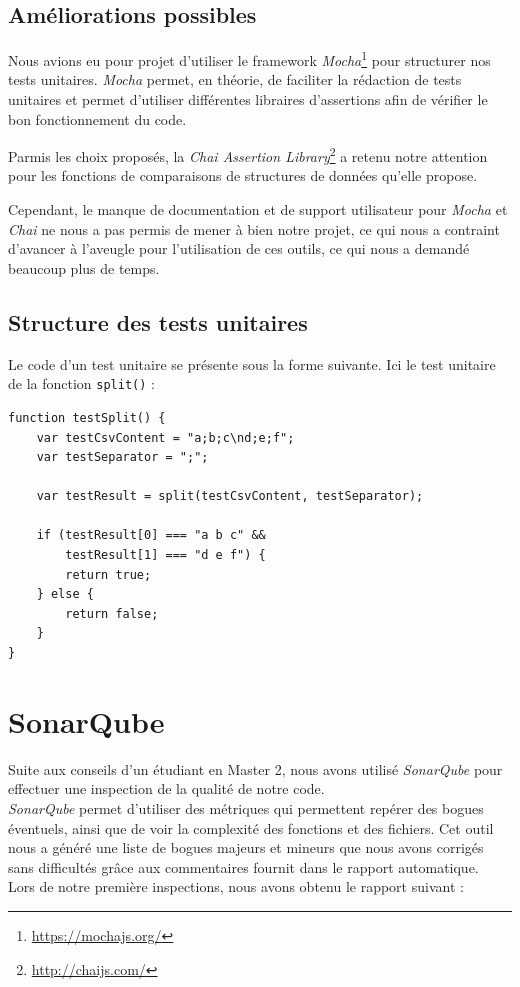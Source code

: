 \subsection{Améliorations possibles}

Nous avions eu pour projet d'utiliser le framework {\it Mocha}\footnote{\url{https://mochajs.org/}} pour structurer nos tests unitaires. {\it Mocha} permet, en théorie, de faciliter la rédaction de tests unitaires et permet d'utiliser différentes libraires d'assertions afin de vérifier le bon fonctionnement du code.

Parmis les choix proposés, la {\it Chai Assertion Library}\footnote{\url{http://chaijs.com/}} a retenu notre attention pour les fonctions de comparaisons de structures de données qu'elle propose.

Cependant, le manque de documentation et de support utilisateur pour {\it Mocha} et {\it Chai} ne nous a pas permis de mener à bien notre projet, ce qui nous a contraint d'avancer à l'aveugle pour l'utilisation de ces outils, ce qui nous a demandé beaucoup plus de temps.

\subsection{Structure des tests unitaires}
Le code d'un test unitaire se présente sous la forme suivante. Ici le test unitaire de la fonction {\tt split()} :
\begin{lstlisting}
function testSplit() {
    var testCsvContent = "a;b;c\nd;e;f";
    var testSeparator = ";";

    var testResult = split(testCsvContent, testSeparator);

    if (testResult[0] === "a b c" &&
        testResult[1] === "d e f") {
        return true;
    } else {
        return false;
    }
}
\end{lstlisting}


\section{SonarQube}
Suite aux conseils d'un étudiant en Master 2, nous avons utilisé {\it SonarQube} pour effectuer une inspection de la qualité de notre code.
\\
{\it SonarQube} permet d'utiliser des métriques qui permettent repérer des bogues éventuels, ainsi que de voir la complexité des fonctions et des fichiers. Cet outil nous a généré une liste de bogues majeurs et mineurs que nous avons corrigés sans difficultés grâce aux commentaires fournit dans le rapport automatique.
\\
Lors de notre première inspections, nous avons obtenu le rapport suivant :

